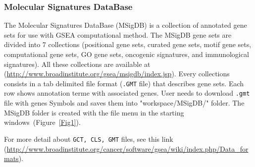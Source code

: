 \documentclass[a4paper]{article}
\begin{document}
\subsubsection{Molecular Signatures DataBase}
The Molecular Signatures DataBase (MSigDB) is a collection of annotated gene sets for use with GSEA computational method. The MSigDB gene sets are divided into 7 collections (positional gene sets, curated gene sets, motif gene sets, computational gene sets, GO gene sets, oncogenic signatures, and immunological signatures). All these collections are available at (\url{http://www.broadinstitute.org/gsea/msigdb/index.jsp}). Every collections consists in a tab delimited file format (\texttt{.GMT} file) that describes gene sets. Each row shows annotation terme with associated genes. 
User needs to download \texttt{.gmt} file with genes Symbols and saves them into "workspace/MSigDB/" folder. The MSigDB folder is created with the file menu in the starting windows~(Figure~\ref{Fig1}).

For more detail about \texttt{GCT, CLS, GMT} files, see this link (\url{http://www.broadinstitute.org/cancer/software/gsea/wiki/index.php/Data_formats}).
\end{document}

